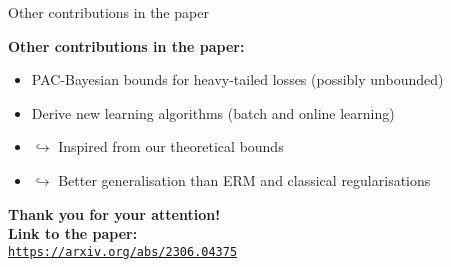 \documentclass{presentation}
\begin{document}
\begin{xframe}{Other contributions in the paper}

\vfill

\begin{block}{}
{\bf Other contributions in the paper:}\\[0.5cm]
\begin{itemize}
    \item PAC-Bayesian bounds for heavy-tailed losses (possibly unbounded)\\[0.5cm]
    \item Derive new learning algorithms (batch and online learning)\\[0.2cm]
    \item[] $\hookrightarrow$ Inspired from our theoretical bounds\\[0.2cm]
    \item[] $\hookrightarrow$ Better generalisation than ERM and classical regularisations 
\end{itemize}

\end{block}

\vfill

\end{xframe}


\appendix

\begin{xtitle}

\vspace{2.0cm}
{\bf Thank you for your attention!}\\

\vspace{1.0cm}
{\bf Link to the paper:}\\
\href{https://arxiv.org/abs/2306.04375}{{\tt https://arxiv.org/abs/2306.04375}}\\

\vfill

\end{xtitle}

 
\end{document}
